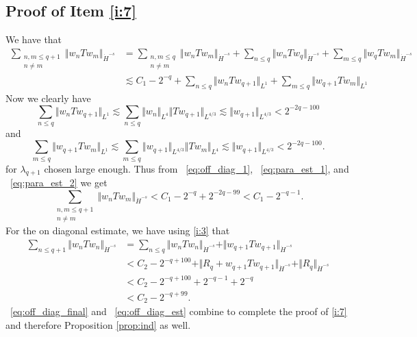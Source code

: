 \documentclass[12pt,reqno,letterpaper]{amsart}
\numberwithin{equation}{section}
\newcommand{\1}{{\bf 1}}
\newcommand{\2}{{\bf 2}}
\theoremstyle{remark}
\theoremstyle{remark}
\begin{document}
\subsection{Proof of Item \ref{i:7}}
We have that
\begin{equation}\label{eq:off_diag_1}
    \begin{split}
        \sum_{\substack{n,m \leq q+1\\ n \not  = m}} \Vert w_n Tw_m \Vert_{\dot{H}^{-s}}
        &= \sum_{\substack{n,m \leq q\\ n \not  = m}} \Vert w_n Tw_m \Vert_{\dot{H}^{-s}} + \sum_{n \leq q} \Vert w_n Tw_q \Vert_{\dot{H}^{-s}} + \sum_{m \leq q} \Vert w_q Tw_m \Vert_{\dot{H}^{-s}}\\
        &\lesssim C_1 - 2^{-q} + \sum_{n \leq q} \Vert w_n Tw_{q+1} \Vert_{L^1} + \sum_{m \leq q} \Vert w_{q+1} Tw_m \Vert_{L^1}
    \end{split}
\end{equation}
Now we clearly have
\begin{equation}\label{eq:para_est_1}
    \sum_{n \leq q} \Vert w_n Tw_{q+1} \Vert_{L^1} \lesssim \sum_{n \leq q} \Vert w_n \Vert_{L^4} \Vert Tw_{q+1} \Vert_{L^{4/3}} \lesssim \Vert w_{q+1} \Vert_{L^{4/3}} < 2^{-2q-100}
\end{equation}
and
\begin{equation}\label{eq:para_est_2}
    \sum_{m \leq q} \Vert w_{q+1} Tw_{m} \Vert_{L^1} \lesssim \sum_{m \leq q} \Vert w_{q+1} \Vert_{L^{4/3}} \Vert Tw_m \Vert_{L^{4}} \lesssim \Vert w_{q+1} \Vert_{L^{4/3}} < 2^{-2q-100}.
\end{equation}
for $\lambda_{q+1}$ chosen large enough. Thus from ~\eqref{eq:off_diag_1}, ~\eqref{eq:para_est_1}, and ~\eqref{eq:para_est_2} we get
\begin{equation}\label{eq:off_diag_final}
    \sum_{\substack{n,m \leq q+1\\ n \not  = m}} \Vert w_n Tw_m \Vert_{\dot{H}^{-s}} < C_1 - 2^{-q} + 2^{-2q-99} < C_1 - 2^{-q-1}.
\end{equation}
For the on diagonal estimate, we have using \ref{i:3} that
\begin{equation}\label{eq:off_diag_est}
\begin{split}
    \sum_{n \leq q+1} \Vert w_{n} Tw_{n} \Vert_{\dot{H}^{-s}} &= \sum_{n \leq q} \Vert w_{n} Tw_{n} \Vert_{\dot{H}^{-s}} + \Vert w_{q+1} Tw_{q+1} \Vert_{\dot{H}^{-s}}\\
    &< C_2 - 2^{-q+100} + \Vert R_q + w_{q+1} Tw_{q+1} \Vert_{\dot{H}^{-s}} + \Vert R_q \Vert_{\dot{H}^{-s}}\\
    &< C_2 - 2^{-q+100} + 2^{-q-1} + 2^{-q}\\
    &< C_2 - 2^{-q+99}.
    \end{split}
\end{equation}
~\eqref{eq:off_diag_final} and ~\eqref{eq:off_diag_est} combine to complete the proof of \ref{i:7} and therefore Proposition \ref{prop:ind} as well.
\end{document}
